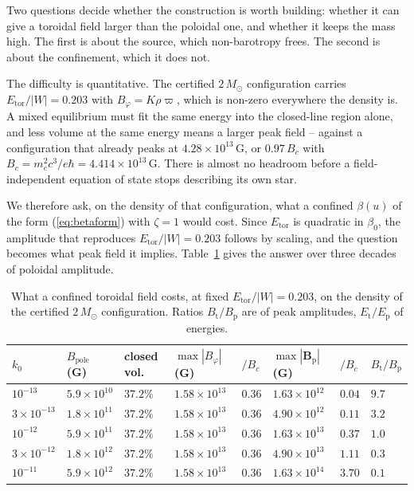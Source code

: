 \documentclass{aa}
\begin{document}
Two questions decide whether the construction is worth building: whether
it can give a toroidal field larger than the poloidal one, and whether it
keeps the mass high. The first is about the source, which non-barotropy
frees. The second is about the confinement, which it does not.

The difficulty is quantitative. The certified $2\,M_\odot$ configuration
carries $E_{\mathrm{tor}}/|W| = 0.203$ with $B_\varphi = K\rho\varpi$,
which is non-zero everywhere the density is. A mixed equilibrium must fit
the same energy into the closed-line region alone, and less volume at the
same energy means a larger peak field -- against a configuration that
already peaks at $4.28\times10^{13}$\,G, or $0.97\,B_c$ with
$B_c = m_e^2c^3/e\hbar = 4.414\times10^{13}$\,G. There is almost no
headroom before a field-independent equation of state stops describing
its own star.

We therefore ask, on the density of that configuration, what a confined
$\beta(u)$ of the form (\ref{eq:betaform}) with $\zeta = 1$ would cost.
Since $E_{\mathrm{tor}}$ is quadratic in $\beta_0$, the amplitude that
reproduces $E_{\mathrm{tor}}/|W| = 0.203$ follows by scaling, and the
question becomes what peak field it implies. Table~\ref{tab:room} gives
the answer over three decades of poloidal amplitude.

\begin{table}
\caption{What a confined toroidal field costs, at fixed
$E_{\mathrm{tor}}/|W| = 0.203$, on the density of the certified
$2\,M_\odot$ configuration. Ratios $B_{\mathrm{t}}/B_{\mathrm{p}}$ are of
peak amplitudes, $E_{\mathrm{t}}/E_{\mathrm{p}}$ of energies.}
\label{tab:room}
\centering
\begin{tabular}{l l l l l l l l}
\hline\hline
$k_0$ & $B_{\mathrm{pole}}$ (G) & closed vol. &
$\max|B_\varphi|$ (G) & $/B_c$ & $\max|\mathbf{B}_{\mathrm{p}}|$ (G) &
$/B_c$ & $B_{\mathrm{t}}/B_{\mathrm{p}}$ \\
\hline
$10^{-13}$        & $5.9\times10^{10}$ & $37.2\%$ & $1.58\times10^{13}$ & $0.36$ & $1.63\times10^{12}$ & $0.04$ & $9.7$ \\
$3\times10^{-13}$ & $1.8\times10^{11}$ & $37.2\%$ & $1.58\times10^{13}$ & $0.36$ & $4.90\times10^{12}$ & $0.11$ & $3.2$ \\
$10^{-12}$        & $5.9\times10^{11}$ & $37.2\%$ & $1.58\times10^{13}$ & $0.36$ & $1.63\times10^{13}$ & $0.37$ & $1.0$ \\
$3\times10^{-12}$ & $1.8\times10^{12}$ & $37.2\%$ & $1.58\times10^{13}$ & $0.36$ & $4.90\times10^{13}$ & $1.11$ & $0.3$ \\
$10^{-11}$        & $5.9\times10^{12}$ & $37.2\%$ & $1.58\times10^{13}$ & $0.36$ & $1.63\times10^{14}$ & $3.70$ & $0.1$ \\
\hline
\end{tabular}
\end{table}
\end{document}
